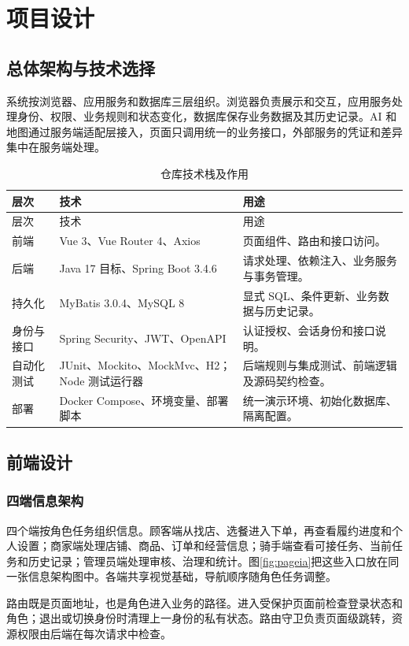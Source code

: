 \chapter{项目设计}
\section{总体架构与技术选择}
系统按浏览器、应用服务和数据库三层组织。浏览器负责展示和交互，应用服务处理身份、权限、业务规则和状态变化，数据库保存业务数据及其历史记录。AI 和地图通过服务端适配层接入，页面只调用统一的业务接口，外部服务的凭证和差异集中在服务端处理。

\begin{longtable}{L{.20\linewidth}L{.27\linewidth}L{.44\linewidth}}
\caption{仓库技术栈及作用}\label{tab:tech-stack}\\\toprule 层次&技术&用途\\\midrule\endfirsthead\toprule 层次&技术&用途\\\midrule\endhead
前端&Vue 3、Vue Router 4、Axios&页面组件、路由和接口访问。\\
后端&Java 17 目标、Spring Boot 3.4.6&请求处理、依赖注入、业务服务与事务管理。\\
持久化&MyBatis 3.0.4、MySQL 8&显式 SQL、条件更新、业务数据与历史记录。\\
身份与接口&Spring Security、JWT、OpenAPI&认证授权、会话身份和接口说明。\\
自动化测试&JUnit、Mockito、MockMvc、H2；Node 测试运行器&后端规则与集成测试、前端逻辑及源码契约检查。\\
部署&Docker Compose、环境变量、部署脚本&统一演示环境、初始化数据库、隔离配置。\\\bottomrule
\end{longtable}
\section{前端设计}
\subsection{四端信息架构}
四个端按角色任务组织信息。顾客端从找店、选餐进入下单，再查看履约进度和个人设置；商家端处理店铺、商品、订单和经营信息；骑手端查看可接任务、当前任务和历史记录；管理员端处理审核、治理和统计。图\ref{fig:pageia}把这些入口放在同一张信息架构图中。各端共享视觉基础，导航顺序随角色任务调整。

路由既是页面地址，也是角色进入业务的路径。进入受保护页面前检查登录状态和角色；退出或切换身份时清理上一身份的私有状态。路由守卫负责页面级跳转，资源权限由后端在每次请求中检查。
